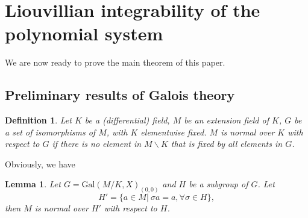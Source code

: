 \documentclass[preprint, 12pt]{elsarticle}
\newtheorem{lem}[thm]{Lemma}
\newtheorem{defn}[thm]{Definition}
\numberwithin{equation}{section}
\newcommand{\Gal}{\mathrm{Gal}}
\begin{document}
\section{Liouvillian integrability of the polynomial system}
\label{sec:4} 
We are now ready to prove the main theorem of this paper. 

\subsection{Preliminary results of Galois theory}
\label{sec:4.1}
\begin{defn}
\label{def:13}Let $K$ be a (differential) field, $M$ be an
extension field of $K$, $G$ be a set of isomorphisms of $M$, with
$K$ elementwise fixed. $M$ is \textit{normal} over $K$ with
respect to $G$ if there is no element in $M\backslash K$ that is fixed by all elements in $G$.
\end{defn}

Obviously, we have
\begin{lem}
\label{le:18}Let $G=\Gal(M/K,X)_{(0,0)}$ and $H$ be a subgroup of $G$. Let
$$H' = \{a\in M|\ \sigma a = a, \forall \sigma\in H\},$$
then $M$ is normal over $H'$ with respect to $H$.
\end{lem}
\end{document}
